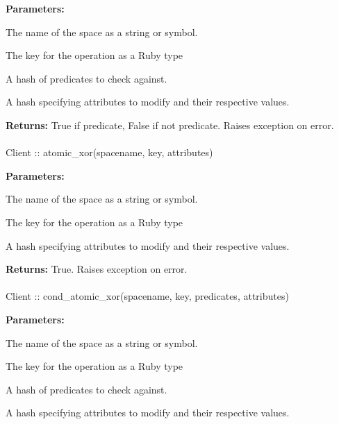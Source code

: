 \noindent\textbf{Parameters:}
\begin{description}[labelindent=\widthof{{\code{predicates}}},leftmargin=*,noitemsep,nolistsep,align=right]
\item[\code{spacename}] The name of the space as a string or symbol.
\item[\code{key}] The key for the operation as a Ruby type
\item[\code{predicates}] A hash of predicates to check against.
\item[\code{attributes}] A hash specifying attributes to modify and their respective values.
\end{description}

\noindent\textbf{Returns:}
True if predicate, False if not predicate.  Raises exception on error.

\paragraph{}
\label{api:ruby:atomic_xor}
\begin{rubycode}
Client :: atomic_xor(spacename, key, attributes)
\end{rubycode}


\noindent\textbf{Parameters:}
\begin{description}[labelindent=\widthof{{\code{attributes}}},leftmargin=*,noitemsep,nolistsep,align=right]
\item[\code{spacename}] The name of the space as a string or symbol.
\item[\code{key}] The key for the operation as a Ruby type
\item[\code{attributes}] A hash specifying attributes to modify and their respective values.
\end{description}

\noindent\textbf{Returns:}
True.  Raises exception on error.

\paragraph{}
\label{api:ruby:cond_atomic_xor}
\begin{rubycode}
Client :: cond_atomic_xor(spacename, key, predicates, attributes)
\end{rubycode}


\noindent\textbf{Parameters:}
\begin{description}[labelindent=\widthof{{\code{predicates}}},leftmargin=*,noitemsep,nolistsep,align=right]
\item[\code{spacename}] The name of the space as a string or symbol.
\item[\code{key}] The key for the operation as a Ruby type
\item[\code{predicates}] A hash of predicates to check against.
\item[\code{attributes}] A hash specifying attributes to modify and their respective values.
\end{description}

